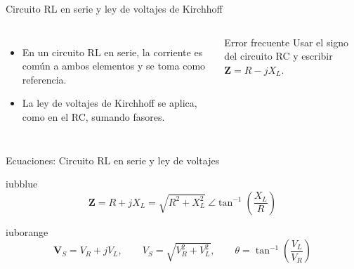 \documentclass[aspectratio=169,11pt,xcolor={table}]{beamer}
\begin{document}
\begin{frame}{{\normalsize Circuito RL en serie y ley de voltajes de Kirchhoff}}
\begin{columns}[c,onlytextwidth]
\small
\begin{itemize}\setlength{\itemsep}{4pt}
  \item En un circuito RL en serie, la corriente es común a ambos elementos y se toma como referencia.
  \item La ley de voltajes de Kirchhoff se aplica, como en el RC, sumando fasores.
\end{itemize}
\begin{cardO}{Error frecuente}
\footnotesize Usar el signo del circuito RC y escribir $\mathbf{Z} = R - jX_L$.
\end{cardO}
\end{columns}
\end{frame}

\begin{frame}{Ecuaciones: Circuito RL en serie y ley de voltajes}
\begin{cajaplana}{iubblue}
\centering
{\large
\begin{equation*}
  \mathbf{Z} = R + jX_L = \sqrt{R^{2} + X_L^{2}}\ \angle \tan^{-1}\!\left(\frac{X_L}{R}\right)
\end{equation*}
}
\end{cajaplana}
\vspace{1mm}
\begin{cajaplana}{iuborange}
\centering
{\large
\begin{equation*}
  \mathbf{V}_S = V_R + jV_L, \qquad V_S = \sqrt{V_R^{2} + V_L^{2}}, \qquad \theta = \tan^{-1}\!\left(\frac{V_L}{V_R}\right)
\end{equation*}
}
\end{cajaplana}
\end{frame}
\end{document}
